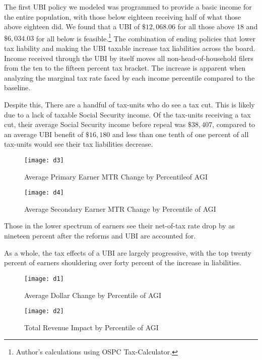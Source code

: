 \documentclass{article}
\begin{document}
The first UBI policy we modeled was programmed to provide a basic income for the entire population, with those below eighteen receiving half of what those above eighteen did. We found that a UBI of $\$12,068.06$ for all those above $18$ and $\$6,034.03$ for all below is feasible.\footnote{Author's calculations using OSPC Tax-Calculator.} The combination of ending policies that lower tax liability and making the UBI taxable increase tax liabilities across the board. Income received through the UBI by itself moves all non-head-of-household filers from the ten to the fifteen percent tax bracket. The increase is apparent when analyzing the marginal tax rate faced by each income percentile compared to the baseline.

Despite this, There are a handful of tax-units who do see a tax cut. This is likely due to a lack of taxable Social Security income. Of the tax-units receiving a tax cut, their average Social Security income before repeal was $\$38,407$, compared to an average UBI benefit of $\$16,180$ and less than one tenth of one percent of all tax-units would see their tax liabilities decrease.


\begin{figure}[H]
\centering
\caption{Average Primary Earner MTR Change by Percentileof AGI}
\texttt{[image: d3]}
\end{figure}

\begin{figure}[H]
\centering
\caption{Average Secondary Earner MTR Change by Percentile of AGI}
\texttt{[image: d4]}
\end{figure}

Those in the lower spectrum of earners see their net-of-tax rate drop by as nineteen percent after the reforms and UBI are accounted for.

As a whole, the tax effects of a UBI are largely progressive, with the top twenty percent of earners shouldering over forty percent of the increase in liabilities.

\begin{figure}[H]
\centering
\caption{Average Dollar Change by Percentile of AGI}
\texttt{[image: d1]}
\end{figure}

\begin{figure}[H]
\centering
\caption{Total Revenue Impact by Percentile of AGI}
\texttt{[image: d2]}
\end{figure}
\end{document}
